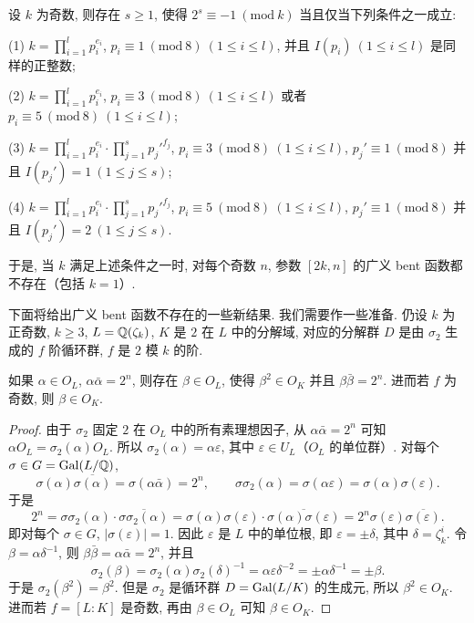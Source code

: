 \begin{lemma}\label{lem:ch9-10}
设 $k$ 为奇数, 则存在 $s\geqslant 1$, 使得 $2^s\equiv -1\ (\mathrm{mod}\ k)$ 当且仅当下列条件之一成立:

(1) $k=\prod_{i=1}^{l}p_i^{e_i}$, $p_i\equiv 1\ (\mathrm{mod}\ 8)\ (1\leqslant i\leqslant l)$, 并且 $I(p_i)\ (1\leqslant i\leqslant l)$ 是同样的正整数;

(2) $k=\prod_{i=1}^{l}p_i^{e_i}$, $p_i\equiv 3\ (\mathrm{mod}\ 8)\ (1\leqslant i\leqslant l)$ 或者 $p_i\equiv 5\ (\mathrm{mod}\ 8)\ (1\leqslant i\leqslant l)$;

(3) $k=\prod_{i=1}^{l}p_i^{e_i}\cdot\prod_{j=1}^{s}p_j'^{f_j}$, $p_i\equiv 3\ (\mathrm{mod}\ 8)\ (1\leqslant i\leqslant l)$, $p_j'\equiv 1\ (\mathrm{mod}\ 8)$ 并且 $I(p_j')=1\ (1\leqslant j\leqslant s)$;

(4) $k=\prod_{i=1}^{l}p_i^{e_i}\cdot\prod_{j=1}^{s}p_j'^{f_j}$, $p_i\equiv 5\ (\mathrm{mod}\ 8)\ (1\leqslant i\leqslant l)$, $p_j'\equiv 1\ (\mathrm{mod}\ 8)$ 并且 $I(p_j')=2\ (1\leqslant j\leqslant s)$.
\end{lemma}

于是, 当 $k$ 满足上述条件之一时, 对每个奇数 $n$, 参数 $[2k,n]$ 的广义 bent 函数都不存在（包括 $k=1$）.

下面将给出广义 bent 函数不存在的一些新结果. 我们需要作一些准备. 仍设 $k$ 为正奇数, $k\geqslant 3$, $L=\mathbb{Q}(\zeta_k)$, $K$ 是 $2$ 在 $L$ 中的分解域, 对应的分解群 $D$ 是由 $\sigma_2$ 生成的 $f$ 阶循环群, $f$ 是 $2$ 模 $k$ 的阶.

\begin{lemma}\label{lem:ch9-11}
如果 $\alpha\in O_L$, $\alpha\bar{\alpha}=2^n$, 则存在 $\beta\in O_L$, 使得 $\beta^2\in O_K$ 并且 $\beta\bar{\beta}=2^n$. 进而若 $f$ 为奇数, 则 $\beta\in O_K$.
\end{lemma}

\begin{proof}
由于 $\sigma_2$ 固定 $2$ 在 $O_L$ 中的所有素理想因子, 从 $\alpha\bar{\alpha}=2^n$ 可知 $\alpha O_L=\sigma_2(\alpha)O_L$. 所以 $\sigma_2(\alpha)=\alpha\varepsilon$, 其中 $\varepsilon\in U_L$（$O_L$ 的单位群）. 对每个 $\sigma\in G=\operatorname{Gal}(L/\mathbb{Q})$,
\[
  \sigma(\alpha)\overline{\sigma(\alpha)}=\sigma(\alpha\bar{\alpha})=2^n,
  \qquad\sigma\sigma_2(\alpha)=\sigma(\alpha\varepsilon)=\sigma(\alpha)\sigma(\varepsilon).
\]
于是
\[
  2^n=\sigma\sigma_2(\alpha)\cdot\overline{\sigma\sigma_2(\alpha)}
  =\sigma(\alpha)\sigma(\varepsilon)\cdot\overline{\sigma(\alpha)\sigma(\varepsilon)}
  =2^n\sigma(\varepsilon)\overline{\sigma(\varepsilon)}.
\]
即对每个 $\sigma\in G$, $|\sigma(\varepsilon)|=1$. 因此 $\varepsilon$ 是 $L$ 中的单位根, 即 $\varepsilon=\pm\delta$, 其中 $\delta=\zeta_k^i$. 令 $\beta=\alpha\delta^{-1}$, 则 $\beta\bar{\beta}=\alpha\bar{\alpha}=2^n$, 并且
\[
  \sigma_2(\beta)=\sigma_2(\alpha)\sigma_2(\delta)^{-1}
  =\alpha\varepsilon\delta^{-2}=\pm\alpha\delta^{-1}=\pm\beta.
\]
于是 $\sigma_2(\beta^2)=\beta^2$. 但是 $\sigma_2$ 是循环群 $D=\operatorname{Gal}(L/K)$ 的生成元, 所以 $\beta^2\in O_K$. 进而若 $f=[L:K]$ 是奇数, 再由 $\beta\in O_L$ 可知 $\beta\in O_K$.
\end{proof}

